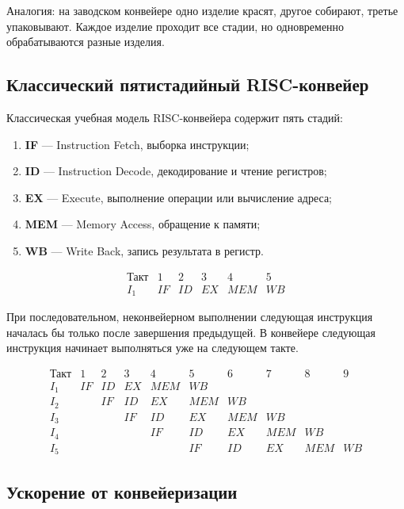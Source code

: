 \documentclass[12pt,a4paper]{article}
\begin{document}
Аналогия: на заводском конвейере одно изделие красят, другое собирают, третье упаковывают. Каждое изделие проходит все стадии, но одновременно обрабатываются разные изделия.

\subsection{Классический пятистадийный RISC-конвейер}

Классическая учебная модель RISC-конвейера содержит пять стадий:

\begin{enumerate}
    \item \textbf{IF} --- Instruction Fetch, выборка инструкции;
    \item \textbf{ID} --- Instruction Decode, декодирование и чтение регистров;
    \item \textbf{EX} --- Execute, выполнение операции или вычисление адреса;
    \item \textbf{MEM} --- Memory Access, обращение к памяти;
    \item \textbf{WB} --- Write Back, запись результата в регистр.
\end{enumerate}

\[
\begin{array}{c|ccccc}
\text{Такт} & 1 & 2 & 3 & 4 & 5 \\
\hline
I_1 & IF & ID & EX & MEM & WB
\end{array}
\]

При последовательном, неконвейерном выполнении следующая инструкция началась бы только после завершения предыдущей. В конвейере следующая инструкция начинает выполняться уже на следующем такте.

\[
\begin{array}{c|ccccccccc}
\text{Такт} & 1 & 2 & 3 & 4 & 5 & 6 & 7 & 8 & 9 \\
\hline
I_1 & IF & ID & EX & MEM & WB &   &   &   &   \\
I_2 &    & IF & ID & EX & MEM & WB &   &   &   \\
I_3 &    &    & IF & ID & EX & MEM & WB &   &   \\
I_4 &    &    &    & IF & ID & EX & MEM & WB &   \\
I_5 &    &    &    &    & IF & ID & EX & MEM & WB
\end{array}
\]

\subsection{Ускорение от конвейеризации}
\end{document}
